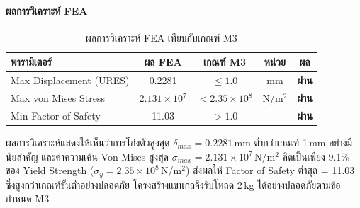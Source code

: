\paragraph{ผลการวิเคราะห์ FEA}

\begin{table}[H]
  \centering
  \caption{ผลการวิเคราะห์ FEA เทียบกับเกณฑ์ M3}
  \label{tab:fea_results}
  \begin{tabular}{lcccc}
    \toprule
    พารามิเตอร์ & ผล FEA & เกณฑ์ M3 & หน่วย & ผล \\
    \midrule
    Max Displacement (URES)
      & 0.2281 & $\leq 1.0$ & mm & \textbf{ผ่าน} \\
    Max von Mises Stress
      & $2.131 \times 10^7$ & $< 2.35 \times 10^8$ & N/m$^2$ & \textbf{ผ่าน} \\
    Min Factor of Safety
      & 11.03 & $> 1.0$ & -- & \textbf{ผ่าน} \\
    \bottomrule
  \end{tabular}
\end{table}

ผลการวิเคราะห์แสดงให้เห็นว่าการโก่งตัวสูงสุด
$\delta_{max} = 0.2281$\,mm ต่ำกว่าเกณฑ์ 1\,mm
อย่างมีนัยสำคัญ และค่าความเค้น Von Mises สูงสุด
$\sigma_{max} = 2.131 \times 10^7$\,N/m$^2$
คิดเป็นเพียง 9.1\% ของ Yield Strength
($\sigma_y = 2.35 \times 10^8$\,N/m$^2$)
ส่งผลให้ Factor of Safety ต่ำสุด = 11.03
ซึ่งสูงกว่าเกณฑ์ขั้นต่ำอย่างปลอดภัย
โครงสร้างแขนกลจึงรับโหลด 2\,kg
ได้อย่างปลอดภัยตามข้อกำหนด M3




